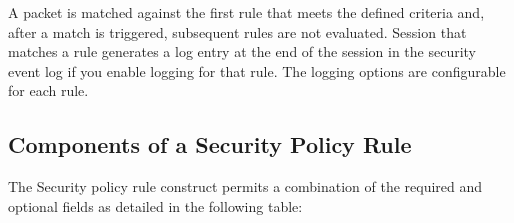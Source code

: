 A packet is matched against the first rule that meets the defined criteria and, after a match is triggered, subsequent rules are not evaluated. 
Session that matches a rule generates a log entry at the end of the session in the security event log if you enable logging for that rule. 
The logging options are configurable for each rule.

\subsection*{\hypertarget{link:Components of a Security Policy Rule}{Components of a Security Policy Rule}}
\label{sec:policies:security:component}

The Security policy rule construct permits a combination of the required and optional fields as detailed in the following table:\\


